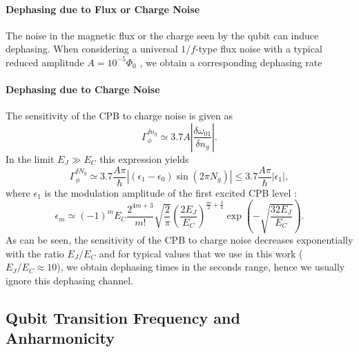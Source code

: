 \paragraph{Dephasing due to Flux or Charge Noise}

The noise in the magnetic flux or the charge seen by the qubit can induce dephasing. When considering a universal $1/f$-type flux noise with a typical reduced amplitude $A=10^{-5}\Phi_0$ \citep{koch_charge-insensitive_2007}, we obtain a corresponding dephasing rate
%
%

\paragraph{Dephasing due to Charge Noise}

The sensitivity of the CPB to charge noise is given as
%
\begin{equation}
\Gamma_\phi^{\delta n_g} \simeq 3.7A \left|\frac{\delta \omega_{01}}{\delta n_g}\right|.
\end{equation}
%
In the limit $E_J\gg E_C$ this expression yields
%
\begin{equation}
\Gamma_\phi^{\delta N_g} \simeq 3.7\frac{A\pi}{\hbar}\left| (\epsilon_1-\epsilon_0)\sin{\left(2\pi N_g\right)}\right| \leq 3.7\frac{A\pi}{\hbar}|\epsilon_1|,
\end{equation}
%
where $\epsilon_1$ is the modulation amplitude of the first excited CPB level \citep{koch_charge-insensitive_2007}:
%
\begin{equation}
\epsilon_m\simeq (-1)^m E_C\frac{2^{4m+3}}{m!}\sqrt{\frac{2}{\pi}}\left(\frac{2E_J}{E_C}\right)^{\frac{m}{2}+\frac{3}{4}}\exp{\left(-\sqrt{\frac{32E_J}{E_C}}\right)}.
\end{equation}
%
As can be seen, the sensitivity of the CPB to charge noise decreases exponentially with the ratio $E_J/E_C$ and for typical values that we use in this work ($E_J/E_C\approx 10$), we obtain dephasing times in the seconds range, hence we usually ignore this dephasing channel. 


\subsection{Qubit Transition Frequency and Anharmonicity}


